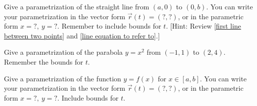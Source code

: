 \begin{problem}
 Give a parametrization of the straight line from $(a,0)$ to $(0,b)$. 
 You can write your parametrization in the vector form $\vec r(t)=(?,?)$, or in the parametric form $x=?,\ y=?$. 
 Remember to include bounds for $t$. [Hint: Review \ref{first line between two points} and \ref{line equation to refer to}.]
\end{problem}


\begin{problem}
 Give a parametrization of the parabola $y=x^2$ from $(-1,1)$ to $(2,4)$. 
 Remember the bounds for $t$.
\end{problem}


\begin{problem}
 Give a parametrization of the function $y=f(x)$ for $x\in[a,b]$.
 You can write your parametrization in the vector form $\vec r(t)=(?,?)$, or in the parametric form $x=?,\ y=?$. 
 Include bounds for $t$.
\end{problem}




